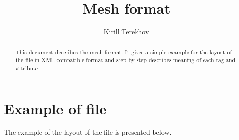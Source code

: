 \documentclass[14pt]{article}
\begin{document}
\title{Mesh format}
\author{Kirill Terekhov}

\maketitle

\begin{abstract}
This document describes the mesh format.
It gives a simple example for the layout of the file in 
XML-compatible format and step by step describes
meaning of each tag and attribute.
\end{abstract}

\section{Example of file}

The example of the layout of the file is presented below.
\end{document}
